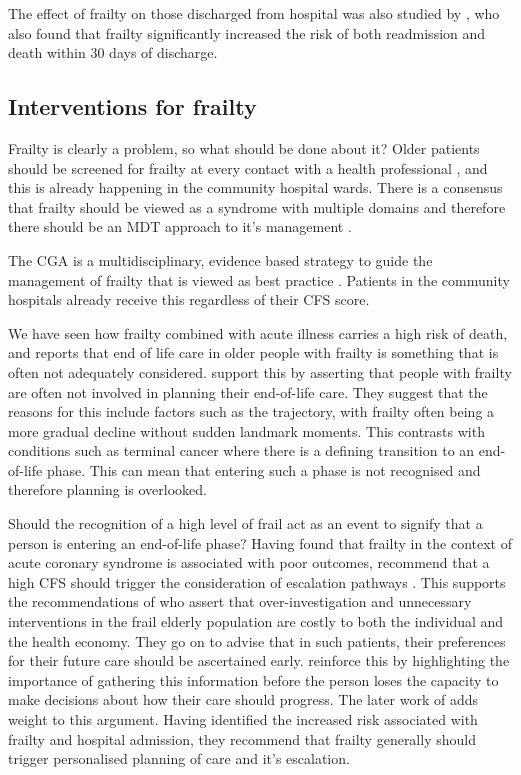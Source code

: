 \documentclass
[
	12pt,
	a4paper,
	oneside,
]{article}
\begin{document}
The effect of frailty on those discharged from hospital was also studied by 
\parencite{kahlon:15}, who also found that frailty significantly increased the 
risk of both readmission and death within 30 days of discharge.

\subsection{Interventions for frailty}
Frailty is clearly a problem, so what should be done about it? Older patients 
should be screened for frailty at every contact with a health professional 
\parencite{bgs:14}, and 
this is already happening in the community hospital wards. There is a consensus that 
frailty should be viewed as a syndrome with multiple domains and therefore
there should be an MDT approach to it's management \parencite{vellas:16}.

The CGA is a multidisciplinary, evidence based strategy to guide the management 
of frailty that is viewed as best practice \parencite{silver:12, bgs:14, oliver:14}. Patients
in the community hospitals already receive this regardless of their CFS score.

We have seen how frailty combined with acute illness carries a high risk of death, and 
\textcite{silver:12} reports that end of life care in older people with frailty
is something that is often not adequately considered. \textcite{oliver:14} support this
by asserting that people with frailty are often not involved in planning their 
end-of-life care. They suggest that the reasons for this include factors such as
the trajectory, with frailty often being a more gradual decline without sudden 
landmark moments. This contrasts with conditions such as terminal cancer where there 
is a defining transition to an end-of-life phase. This can mean that entering such a
phase is not recognised and therefore planning is overlooked. 

Should the recognition of a high level of frail act as an event to signify
that a person is entering an end-of-life phase? Having found that frailty in the 
context of acute coronary syndrome is associated
with poor outcomes, \textcite{kang:15} recommend that a high CFS should
trigger the consideration of escalation pathways \parencite{kang:15}.
This supports the recommendations of \textcite{silver:12} who assert that over-investigation
and unnecessary interventions in the frail elderly population are costly to both the
individual and the health economy. They go on to advise that in such patients, 
their preferences for their future care should be ascertained early. \textcite{oliver:14} 
reinforce this by highlighting the importance of gathering this information
before the person loses the capacity to make decisions about how their care should
progress. The later work of \textcite{romero-ortuno:16} adds weight to this argument.
Having identified the increased risk associated with frailty and hospital admission, 
they recommend that frailty generally should trigger personalised planning of
care and it's escalation.
\end{document}
